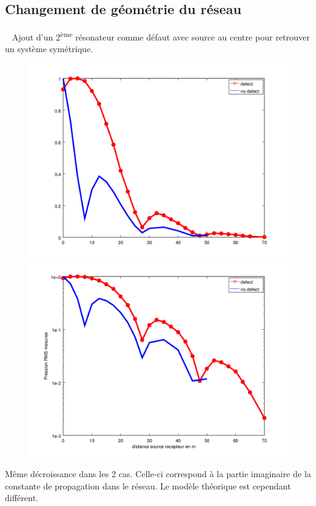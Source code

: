 \documentclass[12pt,notes=show]{beamer} %
\begin{document}
\subsection{Changement de géométrie du réseau}
\begin{frame}{~}
Ajout d'un 2\textsuperscript{ème} résonateur comme défaut avec source au centre pour retrouver un système symétrique.

\begin{figure}
\centering
\includegraphics[scale=0.2]{comparaison_decroissance_lin.png}\hfill
\includegraphics[scale=0.2]{comparaison_decroissance_log.png}
\end{figure}

Même décroissance dans les 2 cas. Celle-ci correspond à la partie imaginaire de la constante de propagation dans le réseau. 
Le modèle théorique est cependant différent.

\end{frame}
\end{document}
